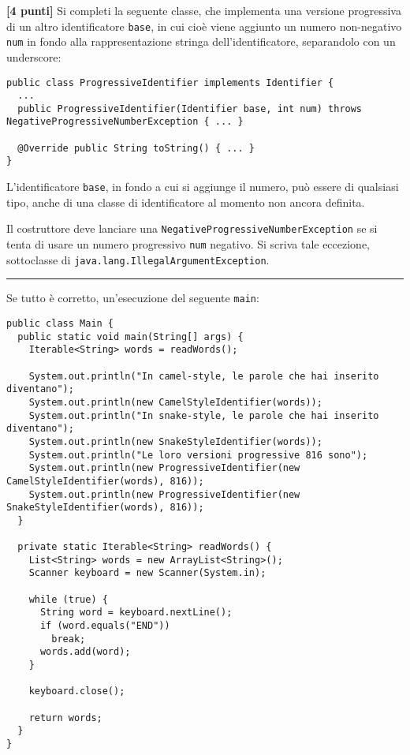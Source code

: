 \documentclass{article}[10pt]
\newcounter{esnu}
\newenvironment{esercizio}{\medskip \noindent {\bf Esercizio\addtocounter{esnu}{1} \arabic{esnu}}}{}
\begin{document}
\begin{esercizio}
\textbf{[4 punti]}
Si completi la seguente classe, che implementa una versione progressiva di un altro identificatore
\texttt{base},
in cui cio\`e viene aggiunto un numero non-negativo \texttt{num}
in fondo alla rappresentazione stringa dell'identificatore,
separandolo con un underscore:
%
{\small
\begin{verbatim}
public class ProgressiveIdentifier implements Identifier {
  ...
  public ProgressiveIdentifier(Identifier base, int num) throws NegativeProgressiveNumberException { ... }

  @Override public String toString() { ... }
}
\end{verbatim}}

\noindent
L'identificatore \texttt{base}, in fondo a cui si aggiunge il numero, pu\`o essere di qualsiasi
tipo, anche di una classe di identificatore al momento non ancora definita.

Il costruttore deve lanciare una \texttt{NegativeProgressiveNumberException} se si tenta di
usare un numero progressivo \texttt{num} negativo. Si scriva tale eccezione, sottoclasse di
\texttt{java.lang.IllegalArgumentException}.
\end{esercizio}

\vspace*{2ex}
\hrule

\vspace*{2ex}

Se tutto \`e corretto, un'esecuzione del seguente \texttt{main}:
%
{\small
\begin{verbatim}
public class Main {
  public static void main(String[] args) {
    Iterable<String> words = readWords();

    System.out.println("In camel-style, le parole che hai inserito diventano");
    System.out.println(new CamelStyleIdentifier(words));
    System.out.println("In snake-style, le parole che hai inserito diventano");
    System.out.println(new SnakeStyleIdentifier(words));
    System.out.println("Le loro versioni progressive 816 sono");
    System.out.println(new ProgressiveIdentifier(new CamelStyleIdentifier(words), 816));
    System.out.println(new ProgressiveIdentifier(new SnakeStyleIdentifier(words), 816));
  }

  private static Iterable<String> readWords() {
    List<String> words = new ArrayList<String>();
    Scanner keyboard = new Scanner(System.in);

    while (true) {
      String word = keyboard.nextLine();
      if (word.equals("END"))
        break;
      words.add(word);
    }

    keyboard.close();

    return words;
  }
}
\end{verbatim}}
\end{document}
